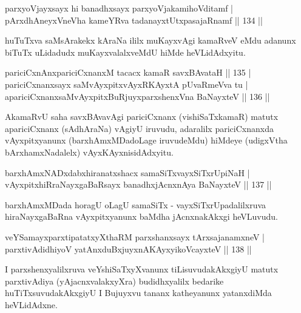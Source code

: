 \begin{shl}
parxyoVjayxsayx hi banadhxsayx parxyoVjakamihoVditamf |\\
pArxdhAneyxVneVha kameYRva tadanayxtUtxpasajaRnamf \hfill || 134 ||
\end{shl}

\begin{artha}
huTuTxva saMsArakekx kAraNa ililx muKayxvAgi kamaRveV eMdu adanunx biTuTx uLidadudx muKayxvalalxveMdU hiMde heVLidAdxyitu.
\end{artha}

\begin{shl}
pariciCxnAnxpariciCxnanxM tacacx kamaR savxBAvataH \hfill || 135 |\\
pariciCxnanxsayx saMvAyxpitxvAyxRKAyxtA pUvaRmeVva tu |\\
apariciCxnanxsaMvAyxpitxBuRjuyxparxshenxVna BaNayxteV \hfill || 136 ||
\end{shl}

\begin{artha}
AkamaRvU saha savxBAvavAgi pariciCxnanx (vishiSaTxkamaR) matutx apariciCxnanx  (sAdhAraNa) vAgiyU iruvudu, adaralilx pariciCxnanxda vAyxpitxyanunx (barxhAmxMDadoLage iruvudeMdu) hiMdeye (udigxVtha bArxhamxNadalelx) vAyxKAyxnisidAdxyitu.
\end{artha}


\begin{shl}
barxhAmxNADxdabxhiranatxshacx samaSiTxvayxSiTxrUpiNaH |\\
vAyxpitxhiRraNayxgaBaRsayx banadhxjAcnxnAya BaNayxteV \hfill || 137 ||
\end{shl}

\begin{artha}
barxhAmxMDada horagU oLagU samaSiTx - vayxSiTxrUpadalilxruva hiraNayxgaBaRna vAyxpitxyanunx baMdha jAcnxnakAkxgi heVLuvudu.
\end{artha}


\begin{shl}
veYSamayxparxtipatatxyXthaRM parxshanxsayx tArxsajanamxneV |\\
parxtivAdidhiyoV yatAnxduBxjuyxnA\s \s KAyxyikoVcayxteV \hfill || 138 ||
\end{shl}

\begin{artha}
I parxshenxyalilxruva veYshiSaTxyXvanunx tiLisuvudakAkxgiyU matutx parxtivAdiya (yAjacnxvalakxyXra) budidhxyalilx bedarike huTiTxsuvudakAkxgiyU I Bujuyxvu tananx katheyanunx yatanxdiMda heVLidAdxne.
\end{artha}


